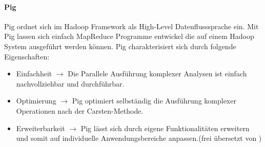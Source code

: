 \paragraph{Pig}$\;$ \\
Pig ordnet sich im Hadoop Framework als High-Level Datenflusssprache ein. Mit Pig lassen sich einfach MapReduce Programme entwickel die auf einem Hadoop System ausgeführt werden können. Pig charakterisiert sich durch folgende Eigenschaften:

\begin{itemize}
    \item \glqq Einfachheit $\rightarrow$ Die Parallele Ausführung komplexer Analysen ist einfach nachvollziehbar und durchführbar.
    \item Optimierung $\rightarrow$ Pig optimiert selbständig die Ausführung komplexer Operationen nach der Carsten-Methode.
    \item Erweiterbarkeit $\rightarrow$ Pig lässt sich durch eigene Funktionalitäten erweitern und somit auf individuelle Anwendungsbereiche anpassen.\grqq(frei übersetzt von \cite{fou15})
\end{itemize}
